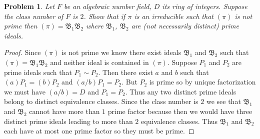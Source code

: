 \documentclass{article}
\newtheorem{problem}{Problem}
\begin{document}
\begin{problem}
Let $F$ be an algebraic number field, $D$ its ring of integers. Suppose the class number of $F$ is $2$. Show that if $\pi$ is an irreducible such that $(\pi)$ is not prime then $(\pi) = \mathfrak{B}_1 \mathfrak{B}_2$ where $\mathfrak{B}_1$, $\mathfrak{B}_2$ are (not necessarily distinct) prime ideals.
\end{problem}
\begin{proof}
Since $(\pi)$ is not prime we know there exist ideals $\mathfrak{B}_1$ and $\mathfrak{B}_2$ such that $(\pi) = \mathfrak{B}_1 \mathfrak{B}_2$ and neither ideal is contained in $(\pi)$. Suppose $P_1$ and $P_2$ are prime ideals such that $P_1 \sim P_2$. Then there exist $a$ and $b$ such that $(a)P_1 = (b)P_2$ and $(a/b)P_1 = P_2$. But $P_2$ is prime so by unique factorization we must have $(a/b) = D$ and $P_1 = P_2$. Thus any two distinct prime ideals belong to distinct equivalence classes. Since the class number is $2$ we see that $\mathfrak{B}_1$ and $\mathfrak{B}_2$ cannot have more than $1$ prime factor because then we would have three distinct prime ideals leading to more than $2$ equivalence classes. Thus $\mathfrak{B}_1$ and $\mathfrak{B}_2$ each have at most one prime factor so they must be prime.
\end{proof}
\end{document}
